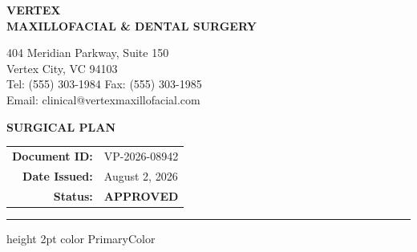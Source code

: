 \documentclass[10pt,letterpaper]{article}
\begin{document}
\noindent
\begin{minipage}[t]{0.65\textwidth}
    {\selectfont\bfseries\Huge\color{PrimaryColor} VERTEX} \\
    {\selectfont\bfseries\large\color{SecondaryColor} MAXILLOFACIAL \& DENTAL SURGERY} \\
    \vspace{0.1cm}
    \begin{small}
        \color{TextLight}
        404 Meridian Parkway, Suite 150 \\
        Vertex City, VC 94103 \\
        Tel: (555) 303-1984 \quad Fax: (555) 303-1985 \\
        Email: clinical@vertexmaxillofacial.com
    \end{small}
\end{minipage}
\begin{minipage}[t]{0.35\textwidth}
    \raggedleft
    \vspace{0.1cm}
    {\selectfont\bfseries\Large\color{PrimaryColor} SURGICAL PLAN} \\
    \vspace{0.2cm}
    \begin{tabular}{rl}
        \textbf{Document ID:} & VP-2026-08942 \\
        \textbf{Date Issued:}  & August 2, 2026 \\
        \textbf{Status:}       & \color{SecondaryColor}\textbf{APPROVED}
    \end{tabular}
\end{minipage}

\vspace{0.4cm}
\hrule height 2pt color PrimaryColor
\vspace{0.5cm}







\clearpage
\nocite{*}


\end{document}
